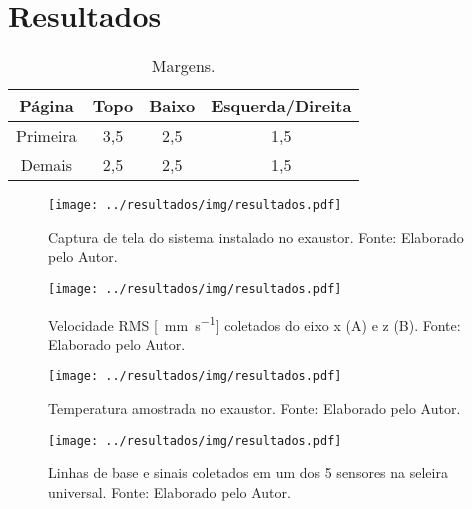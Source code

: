 \documentclass[a4paper]{ifacconf}
\begin{document}
\section{Resultados}

\begin{table}[h!]
  \begin{center}
    \caption{Margens.}\label{tb:margins}
    \begin{tabular}{cccc}
      Página & Topo & Baixo & Esquerda/Direita \\\hline
      Primeira & 3,5 & 2,5 & 1,5 \\
      Demais & 2,5 & 2,5 & 1,5 \\ \hline
    \end{tabular}
  \end{center}
\end{table}


\begin{figure}[h!]
  \begin{center}
      \texttt{[image: ../resultados/img/resultados.pdf]}
  \end{center}
  \caption{Captura de tela do sistema instalado no exaustor. Fonte: Elaborado pelo Autor.}
  \label{fig:exaustor_1}
\end{figure}

\begin{figure}[h!]
  \begin{center}
      \texttt{[image: ../resultados/img/resultados.pdf]}
  \end{center}
  \caption{Velocidade RMS [\SI{}{\milli\metre\per\second}] coletados do eixo x (A) e z (B). Fonte: Elaborado pelo Autor.}
  \label{fig:exaustor_xz}
\end{figure}

\begin{figure}[h!]
  \begin{center}
      \texttt{[image: ../resultados/img/resultados.pdf]}
  \end{center}
  \caption{Temperatura amostrada no exaustor. Fonte: Elaborado pelo Autor.}
  \label{fig:exaustor_temperatura}
\end{figure}


\begin{figure}[h!]
  \begin{center}
      \texttt{[image: ../resultados/img/resultados.pdf]}
  \end{center}
  \caption{Linhas de base e sinais coletados em um dos 5 sensores na seleira universal. Fonte: Elaborado pelo Autor.}
  \label{fig:seleira_universal}
\end{figure}
\end{document}
